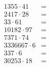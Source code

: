 \documentclass[14pt, a4paper]{extarticle}
\begin{document}
    \begin{align*}
        1355\cdot 41 &=& \\
        2417\cdot 28 &=& \\
        33\cdot 61 &=& \\
        10182\cdot 97 &=& \\
        7371\cdot 74 &=& \\
        3336667\cdot 6 &=& \\
        337\cdot 6 &=& \\
        30253\cdot 18 &=& \\
    \end{align*}
\end{document}
